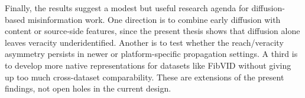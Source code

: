 Finally, the results suggest a modest but useful research agenda for diffusion-based misinformation work. One direction is to combine early diffusion with content or source-side features, since the present thesis shows that diffusion alone leaves veracity underidentified. Another is to test whether the reach/veracity asymmetry persists in newer or platform-specific propagation settings. A third is to develop more native representations for datasets like FibVID without giving up too much cross-dataset comparability. These are extensions of the present findings, not open holes in the current design.
